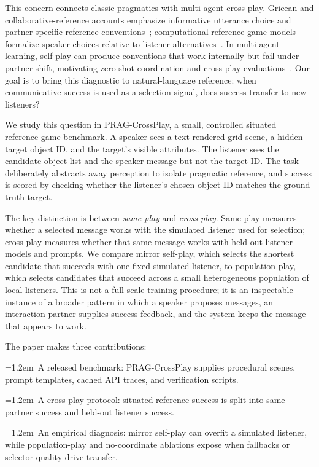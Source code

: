 \documentclass[10pt]{article}
\begin{document}
This concern connects classic pragmatics with multi-agent cross-play. Gricean and collaborative-reference accounts emphasize informative utterance choice and partner-specific reference conventions~\cite{grice1975logic,clark1986referring,brennan1996conceptual}; computational reference-game models formalize speaker choices relative to listener alternatives~\cite{dale1995computational,frank2012predicting,goodman2016pragmatic,andreas2016reasoning}. In multi-agent learning, self-play can produce conventions that work internally but fail under partner shift, motivating zero-shot coordination and cross-play evaluations~\cite{foerster2016learning,lazaridou2017multiagent,carroll2019utility,hu2020otherplay,lucas2022anyplay}. Our goal is to bring this diagnostic to natural-language reference: when communicative success is used as a selection signal, does success transfer to new listeners?

We study this question in PRAG-CrossPlay, a small, controlled situated reference-game benchmark. A speaker sees a text-rendered grid scene, a hidden target object ID, and the target's visible attributes. The listener sees the candidate-object list and the speaker message but not the target ID. The task deliberately abstracts away perception to isolate pragmatic reference, and success is scored by checking whether the listener's chosen object ID matches the ground-truth target.

The key distinction is between \emph{same-play} and \emph{cross-play}. Same-play measures whether a selected message works with the simulated listener used for selection; cross-play measures whether that same message works with held-out listener models and prompts. We compare mirror self-play, which selects the shortest candidate that succeeds with one fixed simulated listener, to population-play, which selects candidates that succeed across a small heterogeneous population of local listeners. This is not a full-scale training procedure; it is an inspectable instance of a broader pattern in which a speaker proposes messages, an interaction partner supplies success feedback, and the system keeps the message that appears to work.

The paper makes three contributions:
\par\noindent\hangindent=1.2em\textbullet\ A released benchmark: PRAG-CrossPlay supplies procedural scenes, prompt templates, cached API traces, and verification scripts.
\par\noindent\hangindent=1.2em\textbullet\ A cross-play protocol: situated reference success is split into same-partner success and held-out listener success.
\par\noindent\hangindent=1.2em\textbullet\ An empirical diagnosis: mirror self-play can overfit a simulated listener, while population-play and no-coordinate ablations expose when fallbacks or selector quality drive transfer.
\end{document}
